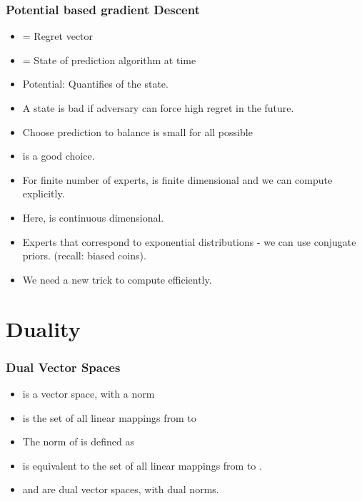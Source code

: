 \documentclass{beamer}
\begin{document}
\begin{frame}
  \frametitle{Potential based gradient Descent}
  \begin{itemize}
  \item {} = Regret vector 
  \item {} = State of prediction algorithm at time 
  \item Potential: \R{$\Phi(\RR)$} Quantifies  of the
    state.
  \item A state is bad if adversary can force high regret in the future.
  \item Choose prediction to balance  is small for all possible 
  \item {} is a good choice.
  \item For finite number of experts,  is finite
    dimensional and we can compute  explicitly.
  \item Here,  is continuous
    dimensional.
  \item Experts that correspond to exponential distributions - we can
    use conjugate priors. (recall: biased coins).
  \item We need a new trick to compute  efficiently.
  \end{itemize}
\end{frame}

\section{Duality}

\begin{frame}
\frametitle{Dual Vector Spaces}

\begin{itemize}
\item {} is a vector space, with a norm 
\item {} is the set of all linear mappings from  to
  \item
  The norm of  is defined as
\item {} is equivalent to the set of all linear mappings from  to
  .
\item {} and  are dual vector spaces, with dual norms. 
\end{itemize}
\end{frame}
\end{document}
